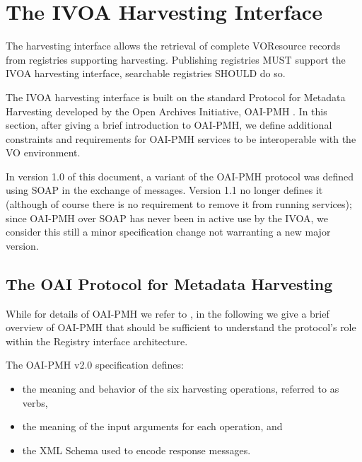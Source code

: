 \documentclass{ivoa}
\begin{document}
\section{The IVOA Harvesting Interface}

\label{harvesting}

The harvesting interface allows the retrieval of complete VOResource
records from registries supporting harvesting.  Publishing registries
MUST support the IVOA harvesting interface, searchable registries SHOULD
do so.

The IVOA harvesting interface is built on the standard Protocol for
Metadata Harvesting developed by the Open Archives Initiative, OAI-PMH
\citep{std:OAIPMH}.  In this section, after giving a brief introduction
to OAI-PMH, we define additional constraints and requirements for
OAI-PMH services to be interoperable with the VO environment.

In version 1.0 of this document, a variant of the OAI-PMH
protocol was defined using SOAP in the exchange of messages.  Version
1.1 no longer defines it (although of course there is no requirement to
remove it from running services); since OAI-PMH over SOAP has never been
in active use by the IVOA, we consider this still a minor specification
change not warranting a new major version.

\subsection{The OAI Protocol for Metadata Harvesting}

\label{oaipmh}

While for details of OAI-PMH we refer to \citet{std:OAIPMH}, 
in the following we give a
brief overview of OAI-PMH that should be sufficient to understand the
protocol's role within the Registry interface architecture.

The OAI-PMH v2.0 specification defines:


\begin{itemize}

\item the meaning and behavior of the six harvesting operations, referred
to as verbs,{}

\item the meaning of the input arguments for each operation, and{}

\item the XML Schema used to encode response messages.{}
\end{itemize}
\end{document}
